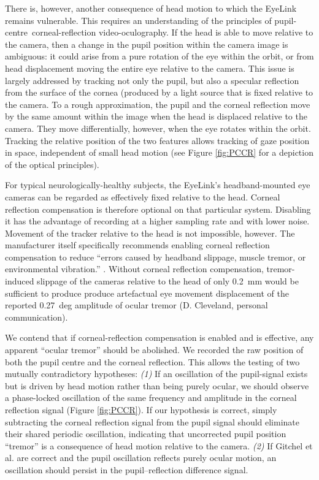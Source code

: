 \documentclass[jou,a4paper]{apa6}
\begin{document}
There is, however, another consequence of head motion to which the EyeLink remains vulnerable. This requires an understanding of the principles of pupil-centre~corneal-reflection video-oculography. If the head is able to move relative to the camera, then a change in the pupil position within the camera image is ambiguous: it could arise from a pure rotation of the eye within the orbit, or from head displacement moving the entire eye relative to the camera. This issue is largely addressed by tracking not only the pupil, but also a specular reflection from the surface of the cornea (produced by a light source that is fixed relative to the camera. To a rough approximation, the pupil and the corneal reflection move by the same amount within the image when the head is displaced relative to the camera. They move differentially, however, when the eye rotates within the orbit. Tracking the relative position of the two features allows tracking of gaze position in space, independent of small head motion (see Figure \ref{fig:PCCR} for a depiction of the optical principles).

For typical neurologically-healthy subjects, the EyeLink's headband-mounted eye cameras can be regarded as effectively fixed relative to the head. Corneal reflection compensation is therefore optional on that particular system. Disabling it has the advantage of recording at a higher sampling rate and with lower noise. Movement of the tracker relative to the head is not impossible, however. The manufacturer itself specifically recommends enabling corneal reflection compensation to reduce ``errors caused by headband slippage, muscle tremor, or environmental vibration.'' \citep{SR-Research-Ltd2002EyeLink-II-User}. Without corneal reflection compensation, tremor-induced slippage of the cameras relative to the head of only 0.2~mm would be sufficient to produce produce artefactual eye movement displacement of the reported 0.27~deg amplitude of ocular tremor (D. Cleveland, personal communication).

We contend that if corneal-reflection compensation is enabled and is effective, any apparent ``ocular tremor'' should be abolished. We recorded the raw position of both the pupil centre and the corneal reflection. This allows the testing of two mutually contradictory hypotheses: \textit{(1)} If an oscillation of the pupil-signal exists but is driven by head motion rather than being purely ocular, we should observe a phase-locked oscillation of the same frequency and amplitude in the corneal reflection signal (Figure \ref{fig:PCCR}). If our hypothesis is correct, simply subtracting the corneal reflection signal from the pupil signal should eliminate their shared periodic oscillation, indicating that uncorrected pupil position ``tremor'' is a consequence of head motion relative to the camera. \textit{(2)} If Gitchel et al. are correct and the pupil oscillation reflects purely ocular motion, an oscillation should persist in the pupil--reflection difference signal.
\end{document}
